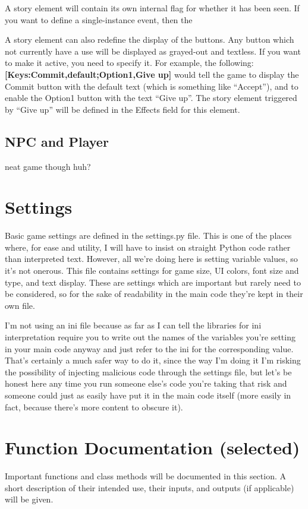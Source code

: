 \documentclass[11pt]{article}
\begin{document}
A story element will contain its own internal flag for whether it has been seen.
If you want to define a single-instance event, then the 

A story element can also redefine the display of the buttons.
Any button which not currently have a use will be displayed as grayed-out and textless.
If you want to make it active, you need to specify it.
For example, the following: \textbf{[Keys:Commit,default;Option1,Give up]} would tell the game to display the Commit button with the default text (which is something like ``Accept''), and to enable the Option1 button with the text ``Give up''.
The story element triggered by ``Give up'' will be defined in the Effects field for this element.
\subsection{NPC and Player}
neat game though huh?
\section{Settings}
Basic game settings are defined in the settings.py file.
This is one of the places where, for ease and utility, I will have to insist on straight Python code rather than interpreted text.
However, all we're doing here is setting variable values, so it's not onerous.
This file contains settings for game size, UI colors, font size and type, and text display.
These are settings which are important but rarely need to be considered, so for the sake of readability in the main code they're kept in their own file.

I'm not using an ini file because as far as I can tell the libraries for ini interpretation require you to write out the names of the variables you're setting in your main code anyway and just refer to the ini for the corresponding value.
That's certainly a much safer way to do it, since the way I'm doing it I'm risking the possibility of injecting malicious code through the settings file, but let's be honest here any time you run someone else's code you're taking that risk and someone could just as easily have put it in the main code itself (more easily in fact, because there's more content to obscure it).

\section{Function Documentation (selected)}
Important functions and class methods will be documented in this section.
A short description of their intended use, their inputs, and outputs (if applicable) will be given.
\end{document}
